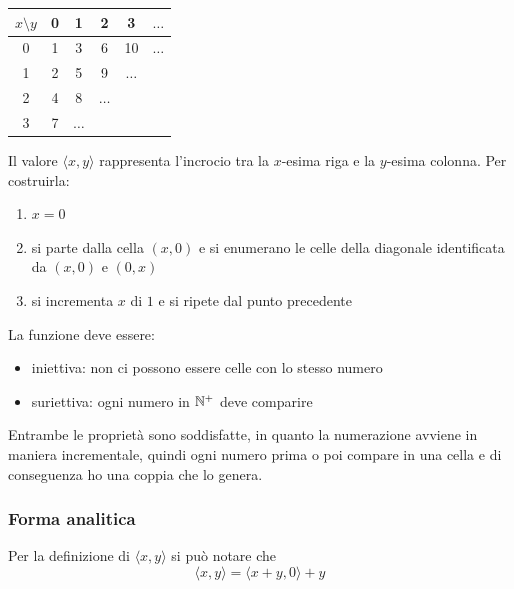 \begin{center}
	\begin{minipage}[h]{0.45\textwidth}
		{\renewcommand{\arraystretch}{1.3}
			\begin{tabular}{c | c c c c c}
				$x\setminus y$ & 0 & 1 & 2 & 3 & $\dots$ \\ 
				\hline
				0 & 1 & 3 & 6 & 10 & $\dots$ \\
				1 & 2 & 5 & 9 & $\dots$ & \\
				2 & 4 & 8 & $\dots$ && \\
				3 & 7 & $\dots$ &&& \\
		\end{tabular}}
	\end{minipage}
	\hfill 
	\begin{minipage}[h]{0.45\textwidth}
		
	\end{minipage}
\end{center}

Il valore $\langle x,y \rangle$ rappresenta l'incrocio tra la $x$-esima riga e la $y$-esima colonna. Per costruirla:
\begin{enumerate}
	\item $x = 0$
	\item si parte dalla cella $(x,0)$ e si enumerano le celle della diagonale identificata da $(x,0)$ e $(0,x)$
	\item si incrementa $x$ di $1$ e si ripete dal punto precedente
\end{enumerate}

La funzione deve essere: 
\begin{itemize}
	\item iniettiva: non ci possono essere celle con lo stesso numero
	\item suriettiva: ogni numero in $\mathbb{N}^+$ deve comparire
\end{itemize}
Entrambe le proprietà sono soddisfatte, in quanto la numerazione avviene in maniera incrementale, quindi ogni numero prima o poi compare in una cella e di conseguenza ho una coppia che lo genera.\\

\subsubsection{Forma analitica} 
Per la definizione di $\langle x,y \rangle$ si può notare che
$$ \langle x,y \rangle = \langle x + y,0 \rangle + y $$

\begin{center}
	
\end{center}

